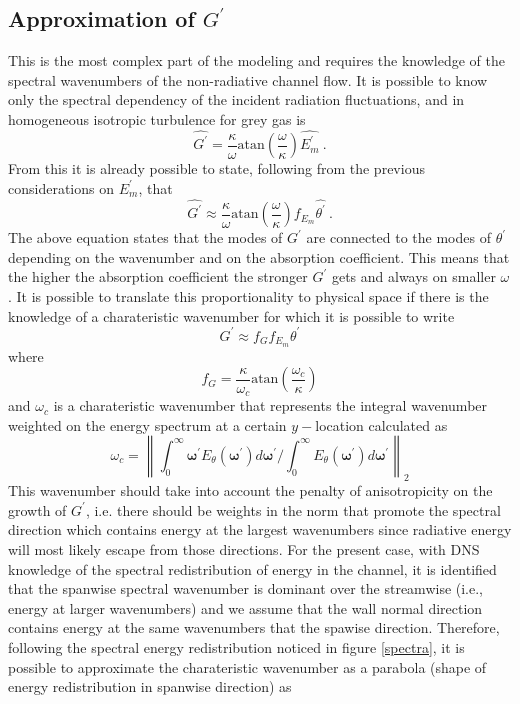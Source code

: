 \documentclass[10pt]{article}
\newcommand{\norm}[1]{\left\lVert#1\right\rVert}
\def\lp{\left(}
\def\rp{\right)}
\def\tr{{\theta^\prime}}
\begin{document}
\subsection*{Approximation of $G^\prime$}
This is the most complex part of the modeling and requires the knowledge of the spectral wavenumbers of the non-radiative channel flow. It is possible to know only the spectral dependency of the incident radiation fluctuations, and in homogeneous isotropic turbulence for grey gas is
\begin{equation*}
\widehat{G^\prime} = \frac{\kappa}{\omega} \text{atan}\lp\frac{\omega}{\kappa} \rp \widehat{E_m^\prime} \ .
\end{equation*} 
From this it is already possible to state, following from the previous considerations on $E_m^\prime$, that
\begin{equation*}
\widehat{G^\prime} \approx \frac{\kappa}{\omega} \text{atan}\lp\frac{\omega}{\kappa} \rp f_{E_m} \widehat{\tr} \ .
\end{equation*}
The above equation states that the modes of $G^\prime$ are connected to the modes of $\tr$ depending on the wavenumber and on the absorption coefficient. This means that the higher the absorption coefficient the stronger $G^\prime$ gets and always on smaller $\omega$. It is possible to translate this proportionality to physical space if there is the knowledge of a charateristic wavenumber for which it is possible to write
\begin{equation*}
G^\prime \approx f_G f_{E_m} \theta^\prime
\end{equation*}
where 
\begin{equation*}
f_G = \frac{\kappa}{\omega_c} \text{atan}\lp\frac{\omega_c}{\kappa} \rp
\end{equation*}
and $\omega_c$ is a charateristic wavenumber that represents the integral wavenumber weighted on the energy spectrum at a certain $y-$location calculated as
\begin{equation*}
\omega_c = {\norm{\int_{0}^{\infty} \boldsymbol{\omega^\prime} E_{\theta}(\boldsymbol{\omega^\prime}) d \boldsymbol{\omega^\prime} / \int_0^{\infty} E_{\theta}(\boldsymbol{\omega^\prime}) d \boldsymbol{\omega^\prime}}}_2
\end{equation*}
This wavenumber should take into account the penalty of anisotropicity on the growth of $G^\prime$, i.e. there should be weights in the norm that promote the spectral direction which contains energy at the largest wavenumbers since radiative energy will most likely escape from those directions. For the present case, with DNS knowledge of the spectral redistribution of energy in the channel, it is identified that the spanwise spectral wavenumber is dominant over the streamwise (i.e., energy at larger wavenumbers) and we assume that the wall normal direction contains energy at the same wavenumbers that the spawise direction. Therefore, following the spectral energy redistribution noticed in figure \ref{spectra}, it is possible to approximate the charateristic wavenumber as a parabola (shape of energy redistribution in spanwise direction) as
\end{document}
